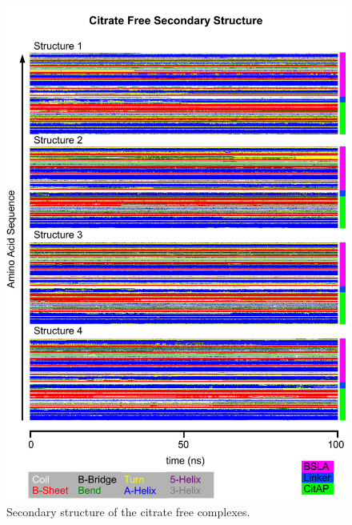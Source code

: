 \documentclass[english, a4paper, 12pt, titlepage, draft]{article}
\begin{document}
\begin{figure}
    \centering
    \includegraphics[width=1.0\textwidth]{figures/DSSP/dssp_free.pdf}
    \caption{Secondary structure of the citrate free complexes.}
    \label{fig:DSSP_free}
\end{figure}
\end{document}
